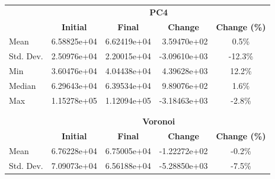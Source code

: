 \begin{table}[h]
    \centering
    \begin{tabular}{l|r|r|r|c}
                  & \multicolumn{4}{c}{\textbf{PC4}}                                                                                                       \\
                  & \multicolumn{1}{c}{\textbf{Initial}} & \multicolumn{1}{c}{\textbf{Final}} & \multicolumn{1}{c}{\textbf{Change}} & \textbf{Change (\%)} \\
        \hline
        Mean      & 6.58825e+04                          & 6.62419e+04                        & 3.59470e+02                         & 0.5\%                \\
        Std. Dev. & 2.50976e+04                          & 2.20015e+04                        & -3.09610e+03                        & -12.3\%              \\
        Min       & 3.60476e+04                          & 4.04438e+04                        & 4.39628e+03                         & 12.2\%               \\
        Median    & 6.29643e+04                          & 6.39534e+04                        & 9.89076e+02                         & 1.6\%                \\
        Max       & 1.15278e+05                          & 1.12094e+05                        & -3.18463e+03                        & -2.8\%               \\
        \multicolumn{5}{c}{}                                                                                                                               \\
        \multicolumn{5}{c}{}                                                                                                                               \\
                  & \multicolumn{4}{c}{\textbf{Voronoi}}                                                                                                   \\
                  & \multicolumn{1}{c}{\textbf{Initial}} & \multicolumn{1}{c}{\textbf{Final}} & \multicolumn{1}{c}{\textbf{Change}} & \textbf{Change (\%)} \\
        \hline
        Mean      & 6.76228e+04                          & 6.75005e+04                        & -1.22272e+02                        & -0.2\%               \\
        Std. Dev. & 7.09073e+04                          & 6.56188e+04                        & -5.28850e+03                        & -7.5\%               \\

\end{tabular}
\end{table}
